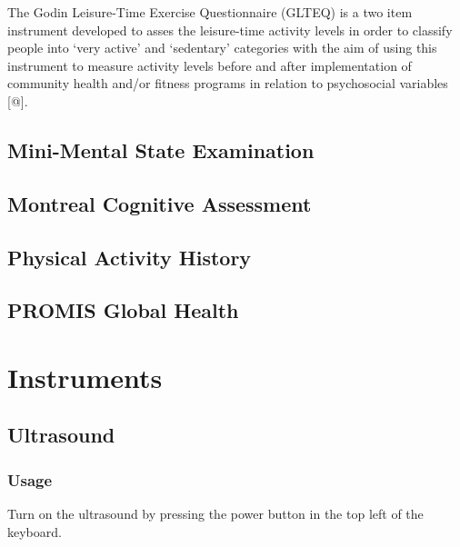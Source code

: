 \documentclass[
]{book}
\begin{document}
The Godin Leisure-Time Exercise Questionnaire (GLTEQ) is a two item instrument developed to asses the leisure-time activity levels in order to classify people into `very active' and `sedentary' categories with the aim of using this instrument to measure activity levels before and after implementation of community health and/or fitness programs in relation to psychosocial variables {[}@{]}.

\hypertarget{Appendix-Surveys-mmse}{%
\section{Mini-Mental State Examination}\label{Appendix-Surveys-mmse}}

\hypertarget{Appendix-Surveys-moca}{%
\section{Montreal Cognitive Assessment}\label{Appendix-Surveys-moca}}

\hypertarget{Appendix-Surveys-pah}{%
\section{Physical Activity History}\label{Appendix-Surveys-pah}}

\hypertarget{Appendix-Surveys-promis}{%
\section{PROMIS Global Health}\label{Appendix-Surveys-promis}}

\hypertarget{Instruments}{%
\chapter{Instruments}\label{Instruments}}

\hypertarget{Appendix-Instruments-Ultrasound}{%
\section{Ultrasound}\label{Appendix-Instruments-Ultrasound}}

\hypertarget{Appendix-Instruments-Ultrasound-Usage}{%
\subsection{Usage}\label{Appendix-Instruments-Ultrasound-Usage}}

Turn on the ultrasound by pressing the power button in the top left of the keyboard.
\end{document}
